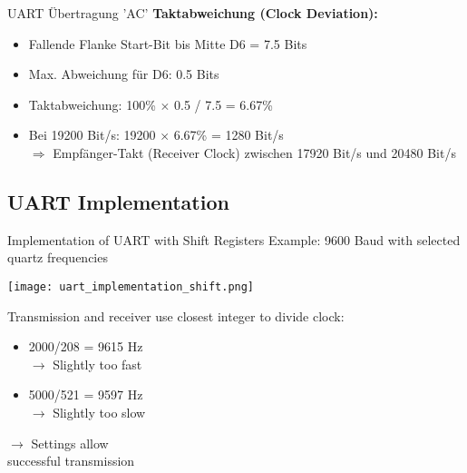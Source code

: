 \begin{example2}{UART Übertragung 'AC'}
    \textbf{Taktabweichung (Clock Deviation):}
    \begin{itemize}
        \item Fallende Flanke Start-Bit bis Mitte D6 = 7.5 Bits
        \item Max. Abweichung für D6: 0.5 Bits
        \item Taktabweichung: 100\% $\times$ 0.5 / 7.5 = 6.67\%
        \item Bei 19200 Bit/s: 19200 $\times$ 6.67\% = 1280 Bit/s \\ $\Rightarrow$ Empfänger-Takt (Receiver Clock) zwischen 17920 Bit/s und 20480 Bit/s
    \end{itemize}
\end{example2}

\subsection{UART Implementation}

\begin{definition}{Implementation of UART with Shift Registers}
    Example: 9600 Baud with selected quartz frequencies

    \begin{minipage}{0.7\linewidth}
    \texttt{[image: uart\_implementation\_shift.png]}
    \end{minipage}
    \begin{minipage}{0.3\linewidth}
    Transmission and receiver use closest integer to divide clock:
    \begin{itemize}
        \item 2000/208 = 9615 Hz \\ $\rightarrow$ Slightly too fast
        \item 5000/521 = 9597 Hz \\ $\rightarrow$ Slightly too slow
    \end{itemize}
    $\rightarrow$ Settings allow \\ successful transmission
    \end{minipage}
\end{definition}

